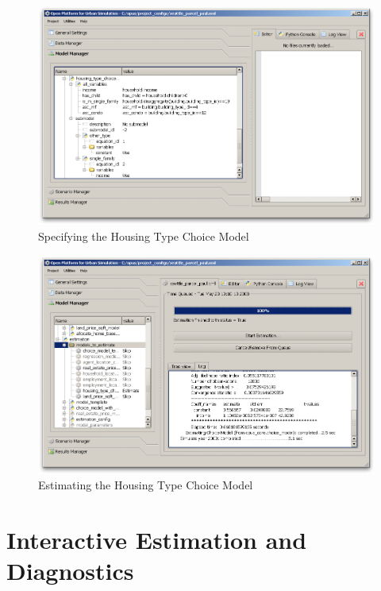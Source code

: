 \begin{figure}[htp]
\begin{center}
\includegraphics[scale=0.35]{graphics/choice-model-specification.png}
\end{center}
\caption{Specifying the Housing Type Choice Model}
\label{fig:choice-model-specification}
\end{figure}

\begin{figure}[htp]
\begin{center}
\includegraphics[scale=0.35]{graphics/choice-model-estimation.png}
\end{center}
\caption{Estimating the Housing Type Choice Model}
\label{fig:choice-model-estimation}
\end{figure}

\section{Interactive Estimation and Diagnostics}


